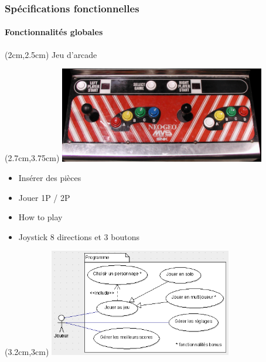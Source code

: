 \begin{frame}

	\frametitle{Spécifications fonctionnelles}
	\framesubtitle{Fonctionnalités globales}
	
	{
		\begin{textblock*}{9cm}(2cm,2.5cm)
			{\LARGE Jeu d'arcade}
			\vfill
		\end{textblock*}
	}
	
	{
		\begin{textblock*}{9cm}(2.7cm,3.75cm)
			\includegraphics[width=9cm]{figures/panneau_de_controle_Neo_Geo_MVS_2p.png}
		\end{textblock*}
	}
	
	{
		\begin{itemize}
			[triangle]
			\item<2> Insérer des pièces
		\end{itemize}
		\begin{itemize}
			[triangle]
			\item<2> Jouer 1P / 2P
		\end{itemize}
		\begin{itemize}
			[triangle]
			\item<2> How to play
		\end{itemize}
		\begin{itemize}
			[triangle]
			\item<2> Joystick 8 directions et 3 boutons
		\end{itemize}
	}
	
	{
		\begin{textblock*}{8cm}(3.2cm,3cm)
			\includegraphics[width=8cm]{figures/use_case_metal_slug_general.png}
		\end{textblock*}
	}
	
\end{frame}
